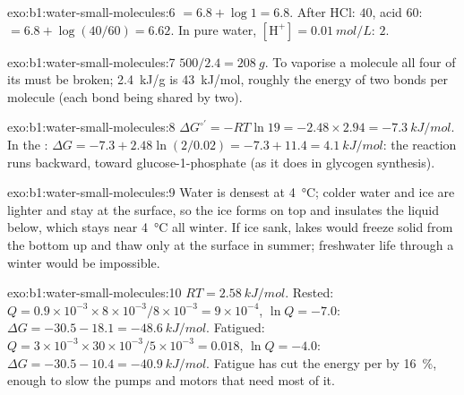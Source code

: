 \begin{solution}{exo:b1:water-small-molecules:6}
 $= 6.8 + \log 1 = 6.8$. After HCl:  $40$, acid $60$:  $= 6.8 +
\log(40/60) = 6.62$. In pure water, $[\mathrm{H^+}] = \qty{0.01}{mol/L}$:
 $2$.
\end{solution}

\begin{solution}{exo:b1:water-small-molecules:7}
$500/2.4 = \qty{208}{g}$. To vaporise a molecule all four of its  must be broken; \qty{2.4}{kJ/g} is \qty{43}{kJ/mol}, roughly the
energy of two bonds per molecule (each bond being shared by two).
\end{solution}

\begin{solution}{exo:b1:water-small-molecules:8}
$\Delta G^{\circ\prime} = -RT\ln 19 = -2.48\times 2.94 =
\qty{-7.3}{kJ/mol}$. In the : $\Delta G = -7.3 + 2.48\ln(2/0.02) =
-7.3 + 11.4 = \qty{+4.1}{kJ/mol}$: the reaction runs backward, toward
glucose-1-phosphate (as it does in glycogen synthesis).
\end{solution}

\begin{solution}{exo:b1:water-small-molecules:9}
Water is densest at \qty{4}{\celsius}; colder water and ice are lighter
and stay at the surface, so the ice forms on top and insulates the
liquid below, which stays near \qty{4}{\celsius} all winter. If ice
sank, lakes would freeze solid from the bottom up and thaw only at the
surface in summer; freshwater life through a winter would be
impossible.
\end{solution}

\begin{solution}{exo:b1:water-small-molecules:10}
$RT = \qty{2.58}{kJ/mol}$. Rested: $Q = 0.9\times 10^{-3}\times 8\times
10^{-3}/8\times 10^{-3} = 9\times 10^{-4}$, $\ln Q = -7.0$: $\Delta G =
-30.5 - 18.1 = \qty{-48.6}{kJ/mol}$. Fatigued: $Q = 3\times 10^{-3}\times
30\times 10^{-3}/5\times 10^{-3} = 0.018$, $\ln Q = -4.0$: $\Delta G =
-30.5 - 10.4 = \qty{-40.9}{kJ/mol}$. Fatigue has cut the energy per 
by \qty{16}{\%}, enough to slow the pumps and motors that need most of
it.
\end{solution}

